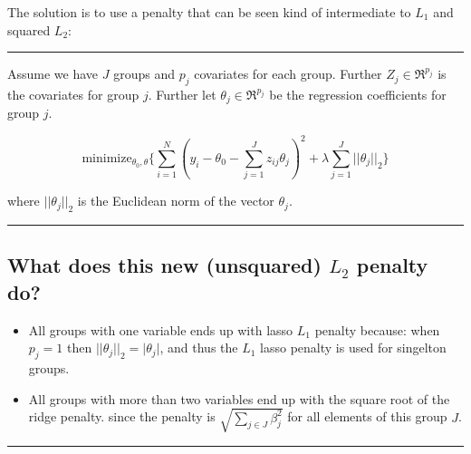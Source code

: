 \documentclass[
  letterpaper,
  DIV=11,
  numbers=noendperiod]{scrartcl}
\providecommand{\tightlist}{%
  \setlength{\itemsep}{0pt}\setlength{\parskip}{0pt}}\usepackage{longtable,booktabs,array}
\begin{document}
The solution is to use a penalty that can be seen kind of intermediate
to \(L_1\) and squared \(L_2\):

\begin{center}\rule{0.5\linewidth}{0.5pt}\end{center}

Assume we have \(J\) groups and \(p_j\) covariates for each group.
Further \(Z_j\in \Re^{p_j}\) is the covariates for group \(j\). Further
let \(\theta_j \in \Re^{p_j}\) be the regression coefficients for group
\(j\).

\[\text{minimize}_{\theta_0,\theta} \{ 
\sum_{i=1}^N (y_i-\theta_0-\sum_{j=1}^J z_{ij}\theta_j )^2 
+ \lambda \sum_{j=1}^J \lvert\lvert \theta_j{\rvert \rvert}_2\}\]

where \(\lvert\lvert \theta_j{\rvert \rvert}_2\) is the Euclidean norm
of the vector \(\theta_j\).

\begin{center}\rule{0.5\linewidth}{0.5pt}\end{center}

\hypertarget{what-does-this-new-unsquared-l_2-penalty-do}{%
\subsection{\texorpdfstring{What does this new (unsquared) \(L_2\)
penalty
do?}{What does this new (unsquared) L\_2 penalty do?}}\label{what-does-this-new-unsquared-l_2-penalty-do}}

\begin{itemize}
\tightlist
\item
  All groups with one variable ends up with lasso \(L_1\) penalty
  because: when \(p_j=1\) then
  \(\lvert\lvert \theta_j{\rvert \rvert}_2=\lvert \theta_j{\rvert}\),
  and thus the \(L_1\) lasso penalty is used for singelton groups.
\item
  All groups with more than two variables end up with the square root of
  the ridge penalty. since the penalty is
  \(\sqrt{\sum_{j \in J}\beta_{j}^2}\) for all elements of this group
  \(J\).
\end{itemize}

\begin{center}\rule{0.5\linewidth}{0.5pt}\end{center}
\end{document}
